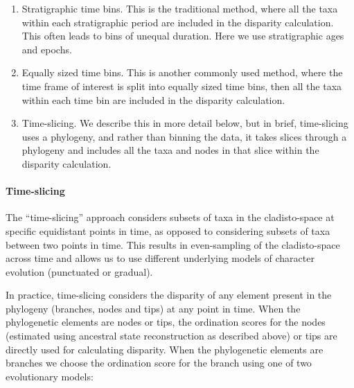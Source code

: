 \documentclass[12pt,a4paper]{article}
\begin{document}
\begin{enumerate}
  \item Stratigraphic time bins. This is the traditional method, where all the taxa within each stratigraphic period are included in the disparity calculation. This often leads to bins of unequal duration. Here we use stratigraphic ages and epochs.
  \item Equally sized time bins. This is another commonly used method, where the time frame of interest is split into equally sized time bins, then all the taxa within each time bin are included in the disparity calculation. 
  \item Time-slicing. We describe this in more detail below, but in brief, time-slicing uses a phylogeny, and rather than binning the data, it takes slices through a phylogeny and includes all the taxa and nodes in that slice within the disparity calculation. 
\end{enumerate}  

\paragraph{Time-slicing} 
\label{time_slicing}
The ``time-slicing'' approach considers subsets of taxa in the cladisto-space at specific equidistant points in time, as opposed to considering subsets of taxa between two points in time.
This results in even-sampling of the cladisto-space across time and allows us to use different underlying models of character evolution (punctuated or gradual). 

In practice, time-slicing considers the disparity of any element present in the phylogeny (branches, nodes and tips) at any point in time.
When the phylogenetic elements are nodes or tips, the ordination scores for the nodes (estimated using ancestral state reconstruction as described above) or tips are directly used for calculating disparity.
When the phylogenetic elements are branches we choose the ordination score for the branch using one of two evolutionary models:

\end{document}
